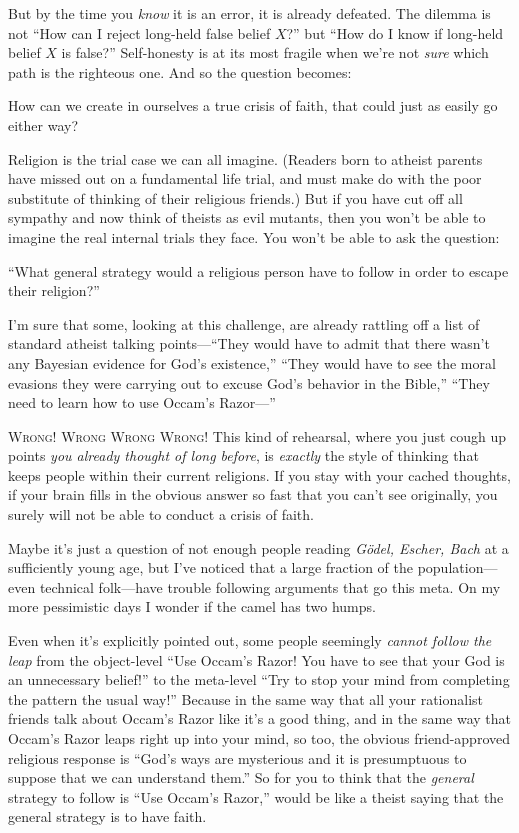 {
 But by the time you \textit{know} it is an error, it is already
defeated. The dilemma is not ``How can I reject
long-held false belief $X$?'' but
``How do I know if long-held belief $X$ is
false?'' Self-honesty is at its most fragile when
we're not \textit{sure} which path is the righteous
one. And so the question becomes:}

{
 How can we create in ourselves a true crisis of faith, that could
just as easily go either way?}

{
 Religion is the trial case we can all imagine. (Readers born to
atheist parents have missed out on a fundamental life trial, and must
make do with the poor substitute of thinking of their religious
friends.) But if you have cut off all sympathy and now think of theists
as evil mutants, then you won't be able to imagine the
real internal trials they face. You won't be able to
ask the question:}

{
 ``What general strategy would a religious person
have to follow in order to escape their religion?''}

{
 I'm sure that some, looking at this challenge, are
already rattling off a list of standard atheist talking
points---``They would have to admit that there
wasn't any Bayesian evidence for God's
existence,'' ``They would have to
see the moral evasions they were carrying out to excuse
God's behavior in the Bible,''
``They need to learn how to use
Occam's Razor---''}

{
\textsc{Wrong! Wrong Wrong Wrong!} This kind of rehearsal, where you just
cough up points \textit{you already thought of long before}, is
\textit{exactly} the style of thinking that keeps people within their
current religions. If you stay with your cached thoughts, if your brain
fills in the obvious answer so fast that you can't see
originally, you surely will not be able to conduct a crisis of faith.}

{
 Maybe it's just a question of not enough people
reading \textit{Gödel, Escher, Bach} at a sufficiently young age, but
I've noticed that a large fraction of the
population---even technical folk---have trouble following arguments
that go this meta. On my more pessimistic days I wonder if the camel
has two humps.}

{
 Even when it's explicitly pointed out, some people
seemingly \textit{cannot follow the leap} from the object-level
``Use Occam's Razor! You have to see
that your God is an unnecessary belief!'' to the
meta-level ``Try to stop your mind from completing the
pattern the usual way!'' Because in the same way that
all your rationalist friends talk about Occam's Razor
like it's a good thing, and in the same way that
Occam's Razor leaps right up into your mind, so too,
the obvious friend-approved religious response is
``God's ways are mysterious and it is
presumptuous to suppose that we can understand
them.'' So for you to think that the \textit{general}
strategy to follow is ``Use Occam's
Razor,'' would be like a theist saying that the
general strategy is to have faith.}

